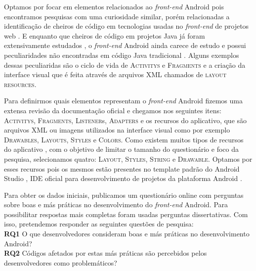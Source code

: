 Optamos por focar em elementos relacionados ao \textit{front-end} Android pois encontramos pesquisas com uma curiosidade similar, por\'em relacionadas a identifica\c{c}\~ao de cheiros de c\'odigo em tecnologias usadas no \textit{front-end} de projetos web \cite{CSSCodeSmell, BB, FinavaroAniche2016}. E enquanto que cheiros de c\'odigo em projetos Java j\'a foram extensivamente estudados \cite{Riel, Refactoring:99, Martin:2008:CCH:1388398}, o \textit{front-end} Android ainda carece de estudo e possui peculiaridades n\~ao encontradas em c\'odigo Java tradicional \cite{Mannan_Dig_Ahmed_Jensen_Abdullah_Almurshed}. Alguns exemplos dessas peculiaridas s\~ao o ciclo de vida de \textsc{Activitys} e \textsc{Fragments} e a cria\c{c}\~ao da interface visual que \'e feita atrav\'es de arquivos XML chamados de \textsc{layout resources}.

Para definirmos quais elementos representam o \textit{front-end} Android fizemos uma extensa revis\~ao da documenta\c{c}\~ao oficial \cite{AndroidDeveloperSite2016} e chegamos nos seguintes itens: \textsc{Activitys}, \textsc{Fragments}, \textsc{Listener}s, \textsc{Adapters} e os recursos do aplicativo, que s\~ao arquivos XML ou imagens utilizados na interface visual como por exemplo \textsc{Drawables}, \textsc{Layouts}, \textsc{Styles} e \textsc{Colors}. Como existem muitos tipos de recursos do aplicativo \cite{AndroidResourcesOverview}, com o objetivo de limitar o tamanho do question\'ario e foco da pesquisa, selecionamos quatro: \textsc{Layout}, \textsc{Styles}, \textsc{String} e \textsc{Drawable}. Optamos por esses recursos pois os mesmos est\~ao presentes no template padr\~ao do Android Studio \cite{FirstApp2017}, IDE oficial para desenvolvimento de projetos da plataforma Android \cite{AndroidStudio}. 

Para obter os dados iniciais, publicamos um question\'ario online com perguntas sobre boas e m\'as pr\'aticas no desenvolvimento do \textit{front-end} Android. Para possibilitar respostas mais completas foram usadas perguntas dissertativas. Com isso, pretendemos responder as seguintes quest\~oes de pesquisa: \\

\textbf{RQ1} O que desenvolvedores consideram boas e m\'as pr\'aticas no desenvolvimento Android? \\

\textbf{RQ2} C\'odigos afetados por estas m\'as pr\'aticas s\~ao percebidos pelos desenvolvedores como problem\'aticos? \\

